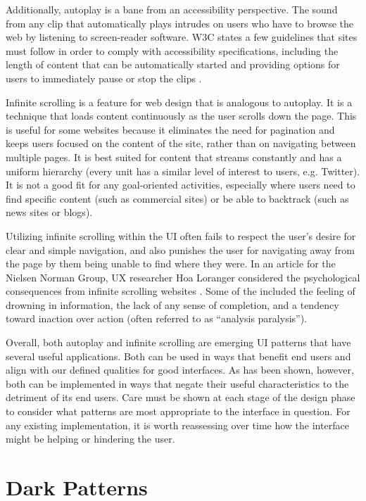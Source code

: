 \documentclass[12pt, oneside]{article}
\begin{document}
Additionally, autoplay is a bane from an accessibility perspective. The sound from any clip that automatically plays intrudes on users who have to browse the web by listening to screen-reader software. W3C states a few guidelines that sites must follow in order to comply with accessibility specifications, including the length of content that can be automatically started and providing options for users to immediately pause or stop the clips \cite{punkchip}.

Infinite scrolling is a feature for web design that is analogous to autoplay. It is a technique that loads content continuously as the user scrolls down the page. This is useful for some websites because it eliminates the need for pagination and keeps users focused on the content of the site, rather than on navigating between multiple pages. It is best suited for content that streams constantly and has a uniform hierarchy (every unit has a similar level of interest to users, e.g. Twitter). It is not a good fit for any goal-oriented activities, especially where users need to find specific content (such as commercial sites) or be able to backtrack (such as news sites or blogs).

Utilizing infinite scrolling within the UI often fails to respect the user's desire for clear and simple navigation, and also punishes the user for navigating away from the page by them being unable to find where they were. In an article for the Nielsen Norman Group, UX researcher Hoa Loranger considered the psychological consequences from infinite scrolling websites \cite{loranger_2014}. Some of the included the feeling of drowning in information, the lack of any sense of completion, and a tendency toward inaction over action (often referred to as ``analysis paralysis'').

Overall, both autoplay and infinite scrolling are emerging UI patterns that have several useful applications. Both can be used in ways that benefit end users and align with our defined qualities for good interfaces. As has been shown, however, both can be implemented in ways that negate their useful characteristics to the detriment of its end users. Care must be shown at each stage of the design phase to consider what patterns are most appropriate to the interface in question. For any existing implementation, it is worth reassessing over time how the interface might be helping or hindering the user.

\section{Dark Patterns}
\end{document}
